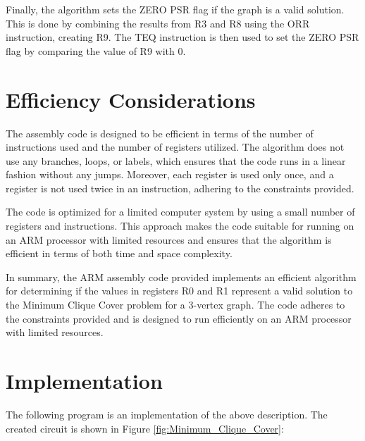 Finally, the algorithm sets the ZERO PSR flag if the graph is a valid solution. This is done by combining the results from R3 and R8 using the ORR instruction, creating R9. The TEQ instruction is then used to set the ZERO PSR flag by comparing the value of R9 with 0.

\section{Efficiency Considerations}

The assembly code is designed to be efficient in terms of the number of instructions used and the number of registers utilized. The algorithm does not use any branches, loops, or labels, which ensures that the code runs in a linear fashion without any jumps. Moreover, each register is used only once, and a register is not used twice in an instruction, adhering to the constraints provided.

The code is optimized for a limited computer system by using a small number of registers and instructions. This approach makes the code suitable for running on an ARM processor with limited resources and ensures that the algorithm is efficient in terms of both time and space complexity.

In summary, the ARM assembly code provided implements an efficient algorithm for determining if the values in registers R0 and R1 represent a valid solution to the Minimum Clique Cover problem for a 3-vertex graph. The code adheres to the constraints provided and is designed to run efficiently on an ARM processor with limited resources.



\section{Implementation}

The following program is an implementation of the above description. The created circuit is shown in Figure \ref{fig:Minimum_Clique_Cover}:

